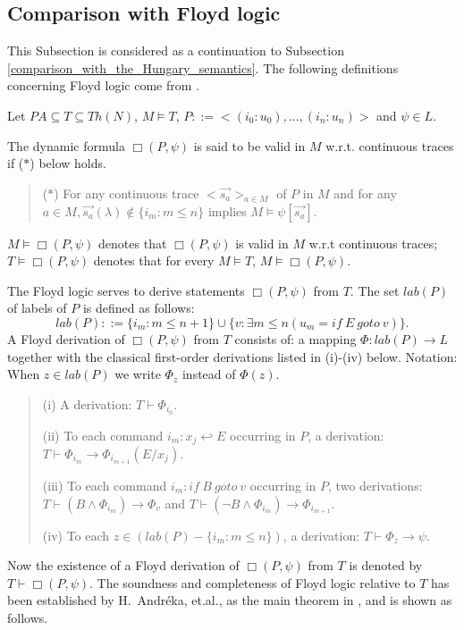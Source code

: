 \documentclass[a4paper,11pt]{article}
\begin{document}
\subsection{Comparison with Floyd logic}\label{comparison_with_floyd_hoare_logic}

This Subsection is considered as a continuation to Subsection \ref{comparison_with_the_Hungary_semantics}. The following definitions concerning Floyd logic come from \cite[p165-166]{andreka_3}.

Let $PA\subseteq T \subseteq Th(N)$, $M\models T$, $P ::= <(i_0:u_0),...,(i_n:u_n)>$ and $\psi\in L$.

The dynamic formula $\Box(P,\psi)$ is said to be valid in $M$ w.r.t. continuous traces if ($\ast$) below holds.
\begin{quote}
($\ast$) For any continuous trace $<\vec{s_a}>_{a\in M}$ of $P$ in $M$ and for any $a\in M, \vec{s_a}(\lambda)\not\in\{i_m: m\leq n\}$
implies $M\models\psi[\vec{s_a}].$
\end{quote}
$M\models \Box(P,\psi)$ denotes that $\Box(P,\psi)$ is valid in $M$ w.r.t continuous traces; $T\models \Box(P,\psi)$ denotes that for every $M\models T$, $M\models \Box(P,\psi)$.

The Floyd logic serves to derive statements $\Box (P, \psi)$ from $T$. The set $lab(P)$ of labels of $P$ is defined as follows:
\begin{equation*}
  lab(P) ::= \{i_{m} : m\leq n+1\} \cup \{v : \exists m\leq n ( u_m = if\ E\ goto\ v )\}.
\end{equation*}
A Floyd derivation of $\Box(P,\psi)$ from $T$ consists of: a mapping $\Phi: lab(P) \rightarrow L$ together with the classical first-order derivations listed in (i)-(iv) below. Notation: When $z \in lab(P)$ we write $\Phi_z$ instead of $\Phi(z)$.

\begin{quote}
(i) A derivation: $T\vdash\Phi_{i_0}$.

(ii) To each command $i_m: x_j\hookleftarrow E$ occurring in $P$, a derivation:
$T\vdash \Phi_{i_m}\rightarrow \Phi_{i_{m+1}}(E/x_j)$.

(iii) To each command $i_m: if\ B\ goto\ v$ occurring in $P$, two derivations:
$T\vdash (B\land\Phi_{i_m})\rightarrow\Phi_v$ and $T\vdash
(\lnot B\land\Phi_{i_m})\rightarrow\Phi_{i_{m+1}}$.

(iv) To each $z\in (lab(P)- \{i_m : m\leq n\})$, a derivation:
$T\vdash \Phi_z\rightarrow\psi$.
\end{quote}
Now the existence of a Floyd derivation of $\Box(P,\psi)$ from
$T$ is denoted by $T\vdash\Box(P, \psi)$. The soundness and completeness of Floyd logic relative to $T$ has been established by H.~Andr\'{e}ka, et.al., as the main theorem in \cite{andreka_3}, and is shown as follows.
\end{document}
